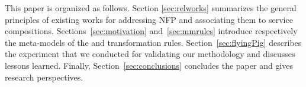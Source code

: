 This paper is organized as follows.
Sec\-tion \ref{sec:relworks} summarizes the general principles of existing works for addressing NFP and associating them to service compositions.
Sections~\ref{sec:motivation}  and~\ref{sec:mmrules} introduce respectively the meta-models of the \pisodm and transformation rules. 
Section~\ref{sec:flyingPig} describes the experiment that we conducted for validating our methodology and discusses lessons learned. 
Finally, Section~\ref{sec:conclusions} concludes the paper and gives research perspectives.





